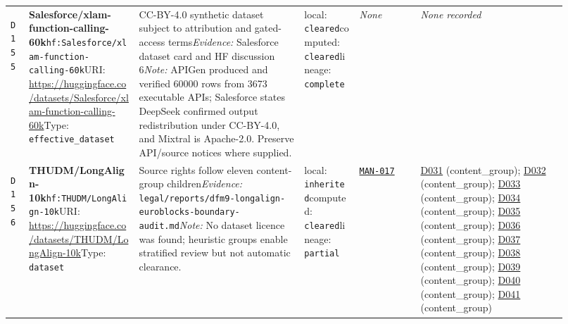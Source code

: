 \documentclass[9pt,a4paper]{article}
\newcommand{\depid}[1]{\hypertarget{dep:#1}{\texttt{#1}}}
\begin{document}
\begin{landscape}
\begin{longtable}{@{}L{0.035\linewidth}L{0.185\linewidth}L{0.27\linewidth}L{0.09\linewidth}L{0.10\linewidth}L{0.24\linewidth}@{}}
\depid{D155} & \textbf{Salesforce/xlam-function-calling-60k}\newline \nolinkurl{hf:Salesforce/xlam-function-calling-60k}\newline URI: \url{https://huggingface.co/datasets/Salesforce/xlam-function-calling-60k}\newline Type: \texttt{effective\_dataset} & CC-BY-4.0 synthetic dataset subject to attribution and gated-access terms\newline \textit{Evidence:} Salesforce dataset card and HF discussion 6\newline \textit{Note:} APIGen produced and verified 60000 rows from 3673 executable APIs; Salesforce states DeepSeek confirmed output redistribution under CC-BY-4.0, and Mixtral is Apache-2.0. Preserve API/source notices where supplied. & local: \texttt{cleared}\newline computed: \texttt{cleared}\newline lineage: \texttt{complete} & \textit{None} & \textit{None recorded} \\
\depid{D156} & \textbf{THUDM/LongAlign-10k}\newline \nolinkurl{hf:THUDM/LongAlign-10k}\newline URI: \url{https://huggingface.co/datasets/THUDM/LongAlign-10k}\newline Type: \texttt{dataset} & Source rights follow eleven content-group children\newline \textit{Evidence:} \nolinkurl{legal/reports/dfm9-longalign-euroblocks-boundary-audit.md}\newline \textit{Note:} No dataset licence was found; heuristic groups enable stratified review but not automatic clearance. & local: \texttt{inherited}\newline computed: \texttt{cleared}\newline lineage: \texttt{partial} & \hyperlink{manual:MAN-017}{\texttt{MAN-017}} & \hyperlink{dep:D031}{D031} (content\_group); \hyperlink{dep:D032}{D032} (content\_group); \hyperlink{dep:D033}{D033} (content\_group); \hyperlink{dep:D034}{D034} (content\_group); \hyperlink{dep:D035}{D035} (content\_group); \hyperlink{dep:D036}{D036} (content\_group); \hyperlink{dep:D037}{D037} (content\_group); \hyperlink{dep:D038}{D038} (content\_group); \hyperlink{dep:D039}{D039} (content\_group); \hyperlink{dep:D040}{D040} (content\_group); \hyperlink{dep:D041}{D041} (content\_group) \\

\end{longtable}
\end{landscape}
\end{document}
